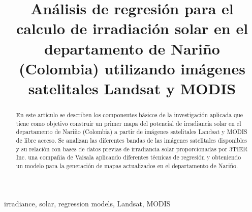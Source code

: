 \documentclass[conference]{IEEEtran}
\begin{document}
\pagestyle{empty}  


\title{Análisis de regresión para el calculo de irradiación solar en el departamento de Nariño (Colombia) utilizando imágenes
satelitales Landsat y MODIS}

\author{
\and
{}
\and
{}
\and
{}
}

\maketitle

\begin{abstract}

En este artículo se describen los componentes básicos de 
la investigación aplicada que tiene como objetivo construir un
primer mapa del potencial de irradiancia solar en el departamento de Nariño (Colombia) a
partir de imágenes satelitales Landsat y MODIS de libre acceso. Se 
analizan las diferentes bandas de las imágenes satelitales disponibles y
su relación con bases de datos previas de irradiancia solar proporcionadas
por 3TIER Inc. una compañia de Vaisala aplicando diferentes técnicas de regresión y obteniendo un modelo
para la generación de mapas actualizados en el departamento de Nariño.

\end{abstract}
 


\begin{IEEEkeywords}
irradiance, solar, regression models, Landsat, MODIS 
\end{IEEEkeywords}
\end{document}
